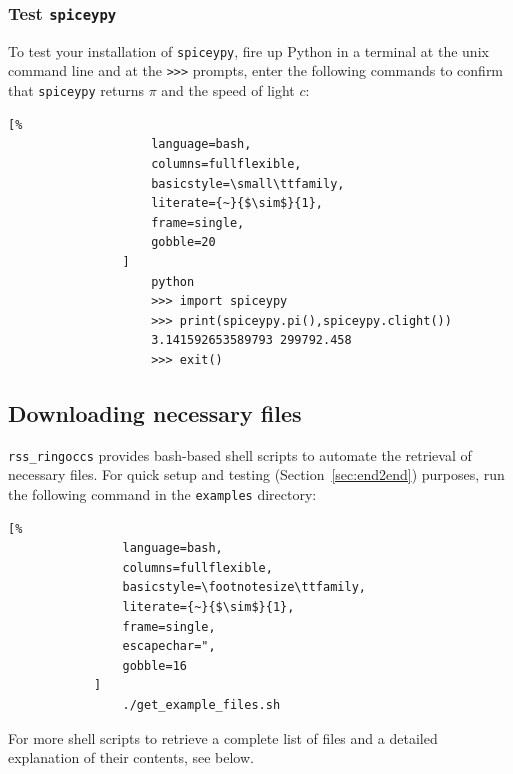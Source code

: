 \documentclass[titlepage, 12pt]{article}
\begin{document}
            \subsubsection{Test \texttt{spiceypy}}
                To test your installation of \texttt{spiceypy},
                fire up Python in a terminal at the
                unix command line and at the
                \texttt{>>>} prompts,
                enter the following commands to
                confirm that \texttt{spiceypy} returns $\pi$
                and the speed of light $c$:
                \begin{lstlisting}[%
                    language=bash,
                    columns=fullflexible,
                    basicstyle=\small\ttfamily,
                    literate={~}{$\sim$}{1},
                    frame=single,
                    gobble=20
                ]
                    python
                    >>> import spiceypy
                    >>> print(spiceypy.pi(),spiceypy.clight())
                    3.141592653589793 299792.458
                    >>> exit()
                \end{lstlisting}
        \subsection{Downloading necessary files}
        \texttt{rss\_ringoccs} provides bash-based shell scripts to automate the retrieval of necessary files. For quick setup and testing (Section~\ref{sec:end2end}) purposes, run the following command in the \texttt{examples} directory:
                \begin{lstlisting}[%
                language=bash,
                columns=fullflexible,
                basicstyle=\footnotesize\ttfamily,
                literate={~}{$\sim$}{1},
                frame=single,
                escapechar=",
                gobble=16
            ]
                ./get_example_files.sh
            \end{lstlisting}
        For more shell scripts to retrieve a complete list of files and a detailed explanation of their contents, see below.
        
\end{document}
